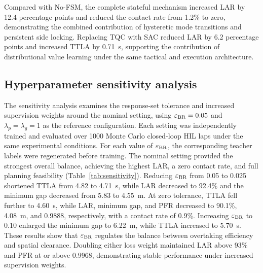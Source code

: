 \documentclass[journal,twoside,web]{ieeecolor}
\begin{document}
Compared with No-FSM, the complete stateful mechanism increased LAR by
12.4 percentage points and reduced the contact rate from 1.2\% to zero,
demonstrating the combined contribution of hysteretic mode transitions and
persistent side locking. Replacing TQC with SAC reduced LAR by 6.2 percentage
points and increased TTLA by 0.71~s, supporting the contribution of
distributional value learning under the same tactical and execution
architecture.




\subsection{Hyperparameter sensitivity analysis}
\label{subsec:sensitivity}

The sensitivity analysis examines the response-set tolerance and increased
supervision weights around the nominal setting, using
$\varepsilon_{\rm BR}=0.05$ and
$\lambda_p=\lambda_g=1$ as the reference configuration. Each setting was
independently trained and evaluated over 1000 Monte Carlo closed-loop HIL laps
under the same experimental conditions. For each value of
$\varepsilon_{\rm BR}$, the corresponding teacher labels were regenerated
before training.
The nominal setting provided the strongest overall balance, achieving the
highest LAR, a zero contact rate, and full planning feasibility
(Table~\ref{tab:sensitivity}). Reducing $\varepsilon_{\rm BR}$ from 0.05 to
0.025 shortened TTLA from 4.82 to 4.71~s, while LAR decreased to 92.4\% and
the minimum gap decreased from 5.83 to 4.55~m. At zero tolerance, TTLA fell
further to 4.60~s, while LAR, minimum gap, and PFR decreased to 90.1\%,
4.08~m, and 0.9888, respectively, with a contact rate of 0.9\%. Increasing
$\varepsilon_{\rm BR}$ to 0.10 enlarged the minimum gap to 6.22~m, while
TTLA increased to 5.70~s. These results show that $\varepsilon_{\rm BR}$
regulates the balance between overtaking efficiency and spatial clearance.
Doubling either loss weight maintained LAR above 93\% and PFR at or above
0.9968, demonstrating stable performance under increased supervision weights.
\end{document}
